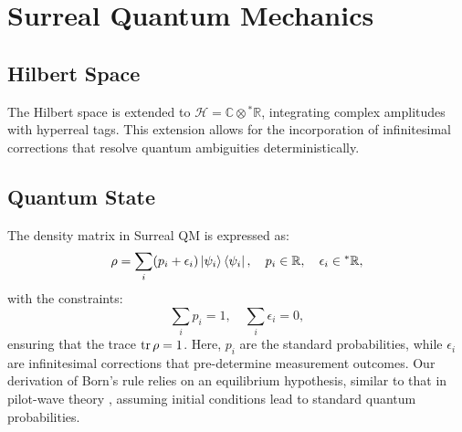 \documentclass{article}
\begin{document}
\section{Surreal Quantum Mechanics}
\subsection{Hilbert Space}
The Hilbert space is extended to \(\mathcal{H} = \mathbb{C} \otimes {}^*\mathbb{R}\), integrating complex amplitudes with hyperreal tags. This extension allows for the incorporation of infinitesimal corrections that resolve quantum ambiguities deterministically.

\subsection{Quantum State}
The density matrix in Surreal QM is expressed as:
\begin{equation}
\rho = \sum_i (p_i + \epsilon_i) \ket{\psi_i}\bra{\psi_i}, \quad p_i \in \mathbb{R}, \quad \epsilon_i \in {}^*\mathbb{R},
\end{equation}
with the constraints:
\begin{equation}
\sum_i p_i = 1, \quad \sum_i \epsilon_i = 0,
\end{equation}
ensuring that the trace \(\tr \rho = 1\). Here, \(p_i\) are the standard probabilities, while \(\epsilon_i\) are infinitesimal corrections that pre-determine measurement outcomes. Our derivation of Born's rule relies on an equilibrium hypothesis, similar to that in pilot-wave theory \cite{Valentini2005}, assuming initial conditions lead to standard quantum probabilities.
\end{document}
